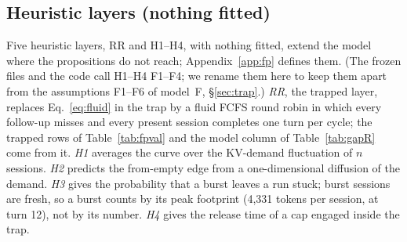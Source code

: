 \subsection{Heuristic layers (nothing fitted)}\label{sec:fp-heur}
Five heuristic layers, RR and H1--H4, with nothing fitted, extend the model where the propositions do not reach; Appendix~\ref{app:fp} defines them. (The frozen files and the code call H1--H4 F1--F4; we rename them here to keep them apart from the assumptions F1--F6 of model~F, \S\ref{sec:trap}.) \emph{RR}, the trapped layer, replaces Eq.~\eqref{eq:fluid} in the trap by a fluid FCFS round robin in which every follow-up misses and every present session completes one turn per cycle; the trapped rows of Table~\ref{tab:fpval} and the model column of Table~\ref{tab:gapR} come from it. \emph{H1} averages the curve over the KV-demand fluctuation of $n$ sessions. \emph{H2} predicts the from-empty edge from a one-dimensional diffusion of the demand. \emph{H3} gives the probability that a burst leaves a run stuck; burst sessions are fresh, so a burst counts by its peak footprint (4,331 tokens per session, at turn 12), not by its number. \emph{H4} gives the release time of a cap engaged inside the trap.

